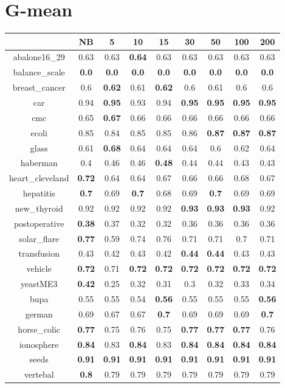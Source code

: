 \documentclass{article}%
\begin{document}
%
\section*{G{-}mean}%
\begin{tabular}{c|cccccccc}%
\hline%
&NB&5&10&15&30&50&100&200\\%
\hline%
abalone16\_29&0.63&0.63&\textbf{0.64}&0.63&0.63&0.63&0.63&0.63\\%
\hline%
balance\_scale&\textbf{0.0}&\textbf{0.0}&\textbf{0.0}&\textbf{0.0}&\textbf{0.0}&\textbf{0.0}&\textbf{0.0}&\textbf{0.0}\\%
\hline%
breast\_cancer&0.6&\textbf{0.62}&0.61&\textbf{0.62}&0.6&0.61&0.6&0.6\\%
\hline%
car&0.94&\textbf{0.95}&0.93&0.94&\textbf{0.95}&\textbf{0.95}&\textbf{0.95}&\textbf{0.95}\\%
\hline%
cmc&0.65&\textbf{0.67}&0.66&0.66&0.66&0.66&0.66&0.66\\%
\hline%
ecoli&0.85&0.84&0.85&0.85&0.86&\textbf{0.87}&\textbf{0.87}&\textbf{0.87}\\%
\hline%
glass&0.61&\textbf{0.68}&0.64&0.64&0.64&0.6&0.62&0.64\\%
\hline%
haberman&0.4&0.46&0.46&\textbf{0.48}&0.44&0.44&0.43&0.43\\%
\hline%
heart\_cleveland&\textbf{0.72}&0.64&0.64&0.67&0.66&0.66&0.68&0.67\\%
\hline%
hepatitis&\textbf{0.7}&0.69&\textbf{0.7}&0.68&0.69&\textbf{0.7}&0.69&0.69\\%
\hline%
new\_thyroid&0.92&0.92&0.92&0.92&\textbf{0.93}&\textbf{0.93}&\textbf{0.93}&0.92\\%
\hline%
postoperative&\textbf{0.38}&0.37&0.32&0.32&0.36&0.36&0.36&0.36\\%
\hline%
solar\_flare&\textbf{0.77}&0.59&0.74&0.76&0.71&0.71&0.7&0.71\\%
\hline%
transfusion&0.43&0.42&0.43&0.42&\textbf{0.44}&\textbf{0.44}&0.43&0.43\\%
\hline%
vehicle&\textbf{0.72}&0.71&\textbf{0.72}&\textbf{0.72}&\textbf{0.72}&\textbf{0.72}&\textbf{0.72}&\textbf{0.72}\\%
\hline%
yeastME3&\textbf{0.42}&0.25&0.32&0.31&0.3&0.32&0.33&0.34\\%
\hline%
bupa&0.55&0.55&0.54&\textbf{0.56}&0.55&0.55&0.55&\textbf{0.56}\\%
\hline%
german&0.69&0.67&0.67&\textbf{0.7}&0.69&0.69&0.69&\textbf{0.7}\\%
\hline%
horse\_colic&\textbf{0.77}&0.75&0.76&0.75&\textbf{0.77}&\textbf{0.77}&\textbf{0.77}&0.76\\%
\hline%
ionosphere&\textbf{0.84}&0.83&\textbf{0.84}&0.83&\textbf{0.84}&\textbf{0.84}&\textbf{0.84}&\textbf{0.84}\\%
\hline%
seeds&\textbf{0.91}&\textbf{0.91}&\textbf{0.91}&\textbf{0.91}&\textbf{0.91}&\textbf{0.91}&\textbf{0.91}&\textbf{0.91}\\%
\hline%
vertebal&\textbf{0.8}&0.79&0.79&0.79&0.79&0.79&0.79&0.79\\%
\hline%
\end{tabular}

%
\end{document}

